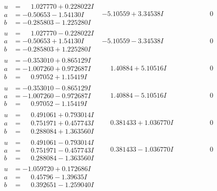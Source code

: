 \documentclass[1p]{elsarticle_modified}
\theoremstyle{definition}
\begin{document}
$$\begin{array}{c|c|c}
\begin{aligned}
u &= \phantom{-}1.027770 + 0.228022 I \\
a &= -0.50653 - 1.54130 I \\
b &= -0.285803 - 1.225280 I\end{aligned}
 & -5.10559 + 3.34538 I & \phantom{-0.000000 } 0 \\ \hline\begin{aligned}
u &= \phantom{-}1.027770 - 0.228022 I \\
a &= -0.50653 + 1.54130 I \\
b &= -0.285803 + 1.225280 I\end{aligned}
 & -5.10559 - 3.34538 I & \phantom{-0.000000 } 0 \\ \hline\begin{aligned}
u &= -0.353010 + 0.865129 I \\
a &= -1.007260 + 0.972687 I \\
b &= \phantom{-}0.97052 + 1.15419 I\end{aligned}
 & \phantom{-}1.40884 + 5.10516 I & \phantom{-0.000000 } 0 \\ \hline\begin{aligned}
u &= -0.353010 - 0.865129 I \\
a &= -1.007260 - 0.972687 I \\
b &= \phantom{-}0.97052 - 1.15419 I\end{aligned}
 & \phantom{-}1.40884 - 5.10516 I & \phantom{-0.000000 } 0 \\ \hline\begin{aligned}
u &= \phantom{-}0.491061 + 0.793014 I \\
a &= \phantom{-}0.751971 + 0.457743 I \\
b &= \phantom{-}0.288084 + 1.363560 I\end{aligned}
 & \phantom{-}0.381433 + 1.036770 I & \phantom{-0.000000 } 0 \\ \hline\begin{aligned}
u &= \phantom{-}0.491061 - 0.793014 I \\
a &= \phantom{-}0.751971 - 0.457743 I \\
b &= \phantom{-}0.288084 - 1.363560 I\end{aligned}
 & \phantom{-}0.381433 - 1.036770 I & \phantom{-0.000000 } 0 \\ \hline\begin{aligned}
u &= -1.059720 + 0.172686 I \\
a &= \phantom{-}0.45796 - 1.39635 I \\
b &= \phantom{-}0.392651 - 1.259040 I\end{aligned}

\end{array}$$
\end{document}
